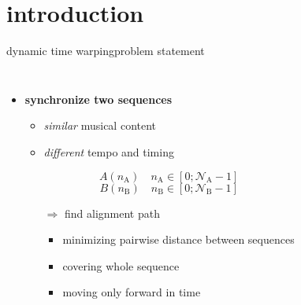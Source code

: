     \section[intro]{introduction}
        \begin{frame}{dynamic time warping}{problem statement}
            \begin{columns}[T]
            \begin{itemize}
                \item   \textbf{synchronize two sequences}
                    \begin{itemize}
                        \item	\textit{similar} musical content
                        \item	\textit{different} tempo and timing
                            \begin{footnotesize}
                            \[A(n_\mathrm{A})\quad n_\mathrm{A} \in [0;\mathcal{N}_\mathrm{A}-1]\]
                            \[B(n_\mathrm{B})\quad n_\mathrm{B} \in [0;\mathcal{N}_\mathrm{B}-1]\]
                            \end{footnotesize}
                        \bigskip
                        \item[$\Rightarrow$] find alignment path 
                            \begin{itemize}
                                \item   minimizing pairwise distance between sequences
                                \item   covering whole sequence
                                \item   moving only forward in time
                            \end{itemize}
                    \end{itemize}
                \end{itemize}
            \end{columns}
        \end{frame}
